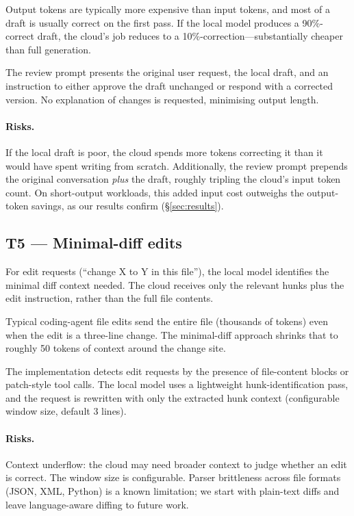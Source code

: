 \documentclass[11pt,a4paper]{article}
\begin{document}
Output tokens are typically more expensive than input tokens, and most
of a draft is usually correct on the first pass. If the local model
produces a 90\%-correct draft, the cloud's job reduces to a
10\%-correction---substantially cheaper than full generation.

The review prompt presents the original user request, the local draft,
and an instruction to either approve the draft unchanged or respond with
a corrected version. No explanation of changes is requested, minimising
output length.

\paragraph{Risks.}
If the local draft is poor, the cloud spends more tokens correcting it
than it would have spent writing from scratch. Additionally, the review
prompt prepends the original conversation \emph{plus} the draft,
roughly tripling the cloud's input token count. On short-output
workloads, this added input cost outweighs the output-token savings, as
our results confirm (\S\ref{sec:results}).

\subsection{T5 --- Minimal-diff edits}
\label{sec:t5}

For edit requests (``change X to Y in this file''), the local model
identifies the minimal diff context needed. The cloud receives only
the relevant hunks plus the edit instruction, rather than the full file
contents.

Typical coding-agent file edits send the entire file (thousands of
tokens) even when the edit is a three-line change. The minimal-diff
approach shrinks that to roughly 50 tokens of context around the change
site.

The implementation detects edit requests by the presence of file-content
blocks or patch-style tool calls. The local model uses a lightweight
hunk-identification pass, and the request is rewritten with only the
extracted hunk context (configurable window size, default 3 lines).

\paragraph{Risks.}
Context underflow: the cloud may need broader context to judge whether
an edit is correct. The window size is configurable. Parser brittleness
across file formats (JSON, XML, Python) is a known limitation; we start
with plain-text diffs and leave language-aware diffing to future work.
\end{document}
